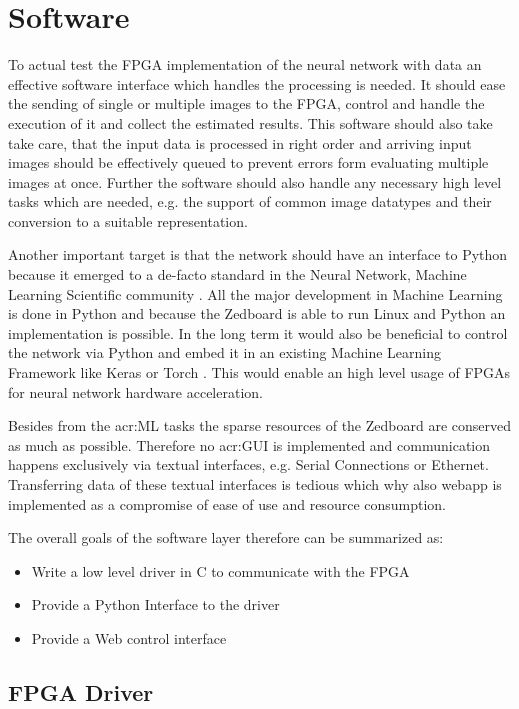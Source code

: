 \section{Software}

To actual test the FPGA implementation of the neural network with data an effective software interface which handles the processing is needed. It should ease the sending of single or multiple images to the FPGA, control and handle the execution of it and collect the estimated results. This software should also take take care, that the input data is processed in right order and arriving input images should be effectively queued to prevent errors form evaluating multiple images at once. Further the software should also handle any necessary high level tasks which are needed, e.g. the support of common image datatypes and their conversion to a suitable representation.

Another important target is that the network should have an interface to Python because it emerged to a de-facto standard in the Neural Network, Machine Learning Scientific community \cite{Virtanen:2020aa}. All the major development in Machine Learning is done in Python and because the Zedboard is able to run Linux and Python an implementation is possible.
In the long term it would also be beneficial to control the network via Python and embed it in an existing Machine Learning Framework like Keras \cite{Gulli:2017aa} or Torch \cite{Paszke:2019aa}. This would enable an high level usage of FPGAs for neural network hardware acceleration. 

Besides from the \gls{acr:ML} tasks the sparse resources of the Zedboard are conserved as much as possible. Therefore no \gls{acr:GUI} is implemented and communication happens exclusively via textual interfaces, e.g. Serial Connections or Ethernet. Transferring data of these textual interfaces is tedious which why also webapp is implemented as a compromise of ease of use and resource consumption.

The overall goals of the software layer therefore can be summarized as:

\begin{itemize}
	\item Write a low level driver in C to communicate with the FPGA
	\item Provide a Python Interface to the driver
	\item Provide a Web control interface
\end{itemize}


\subsection{FPGA Driver}

